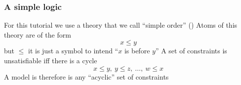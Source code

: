 \begin{frame}
  \frametitle{A simple logic}

  For this tutorial we use a theory that we call ``simple order'' (\So)
  \vfill
  Atoms of this theory are of the form
  $$
    x \leq y
  $$
  but $\leq$ it is just a symbol to intend ``$x$ is before $y$''
  \vfill
  A set of constraints is unsatisfiable iff there is a cycle 
  $$x \leq y,\ y \leq z,\ \ldots,\ w \leq x$$  
  \vfill
  A model is therefore is any ``acyclic'' set of constraints
  \vfill

  \begin{columns}

    \begin{column}{.3\textwidth}

      \begin{overlayarea}{.3\textwidth}{40pt}


      \end{overlayarea}
      
    \end{column}
    
    \begin{column}{.4\textwidth}

      \begin{overlayarea}{.4\textwidth}{40pt}
      \only<1|handout:0>{}
      \end{overlayarea}
      
    \end{column}

    \begin{column}{.2\textwidth}


    \end{column}

  \end{columns}

\end{frame}

